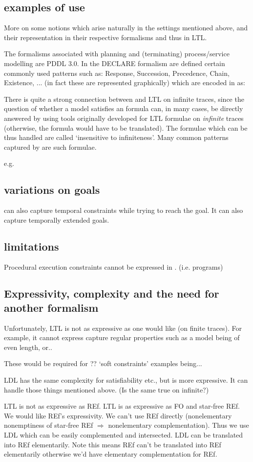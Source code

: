 \subsection{examples of use}

More on some notions which arise naturally in the settings mentioned above,
and their representation in their respective formalisms and thus in LTL.

The formalisms associated with planning and (terminating) process/service modelling are
PDDL 3.0.
In the DECLARE formalism are defined certain commonly used patterns such as:
Response, Succession, Precedence, Chain, Existence, ...
(in fact these are represented graphically)
which are encoded in \ltlf as:


There is quite a strong connection between \ltlf and LTL on infinite traces,
since the question of whether a model satisfies an \ltlf formula can,
in many cases, be directly answered by using tools originally developed for LTL formulae on
\emph{infinite} traces (otherwise, the formula would have to be translated).
The formulae which can be thus handled are called `insensitive to infiniteness'.
\cite{ldlfinsens}
Many common patterns captured by \ltlf are such formulae.

e.g.

\subsection{variations on goals}
\ltlf can also capture temporal constraints while trying to reach the goal.
It can also capture temporally extended goals.

\subsection{limitations}

Procedural execution constraints cannot be expressed in \ltlf.
\cite{ldlfsynth}
(i.e. programs)

\subsection{Expressivity, complexity and the need for another formalism}

Unfortunately, LTL is not as expressive as one would like (on finite traces). For example, it cannot express capture regular properties such as a model being of even length, or..

These would be required for ?? `soft constraints'
examples being...

LDL has the same complexity for satisfiability etc., but is more expressive. It can handle those things mentioned above. (Is the same true on infinite?)

LTL is not as expressive as REf.
LTL is as expressive as FO and star-free REf.
We would like REf's expressivity.
We can't use REf directly (nonelementary nonemptiness of star-free REf $\Rightarrow$ nonelementary complementation).
Thus we use LDL which can be easily complemented and intersected.
LDL can be translated into REf elementarily.
Note this means REf can't be translated into REf elementarily otherwise we'd have elementary complementation for REf.
